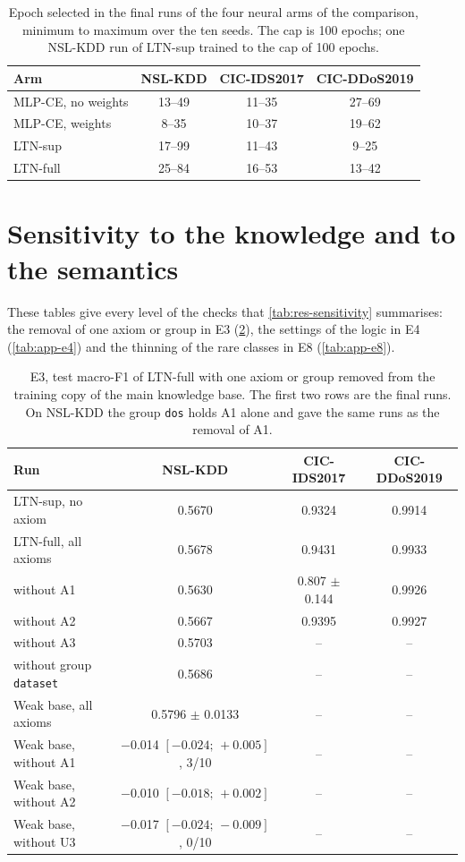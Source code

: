 \begin{table}[htbp]
\centering
\footnotesize
\caption{Epoch selected in the final runs of the four neural arms of the comparison, minimum to maximum over the ten
seeds. The cap is 100 epochs; one NSL-KDD run of LTN-sup trained to the cap of 100 epochs.}
\label{tab:app-epochs}
\setlength{\tabcolsep}{4pt}
\begin{tabular}{@{}lccc@{}}
\toprule
Arm & NSL-KDD & CIC-IDS2017 & CIC-DDoS2019 \\
\midrule
MLP-CE, no weights & 13--49 & 11--35 & 27--69 \\
MLP-CE, weights    & 8--35 & 10--37 & 19--62 \\
LTN-sup            & 17--99 & 11--43 & 9--25 \\
LTN-full           & 25--84 & 16--53 & 13--42 \\
\bottomrule
\end{tabular}
\end{table}

\FloatBarrier
\section{Sensitivity to the knowledge and to the semantics}

These tables give every level of the checks that \cref{tab:res-sensitivity} summarises: the removal of
one axiom or group in E3 (\cref{tab:app-e3}), the settings of the logic in E4 (\cref{tab:app-e4}) and the
thinning of the rare classes in E8 (\cref{tab:app-e8}).


\begin{table}[htbp]
\centering
\footnotesize
\caption{E3, test macro-F1 of LTN-full with one axiom or group removed from the training copy of the main knowledge
base. The first two rows are the final runs. On NSL-KDD the group \texttt{dos} holds A1 alone and gave the same
runs as the removal of A1.}
\label{tab:app-e3}
\setlength{\tabcolsep}{4pt}
\begin{tabular}{@{}lccc@{}}
\toprule
Run & NSL-KDD & CIC-IDS2017 & CIC-DDoS2019 \\
\midrule
LTN-sup, no axiom    & 0.5670 & 0.9324 & 0.9914 \\
LTN-full, all axioms & 0.5678 & 0.9431 & 0.9933 \\
\midrule
without A1           & 0.5630 & 0.807 $\pm$ 0.144 & 0.9926 \\
without A2           & 0.5667 & 0.9395 & 0.9927 \\
without A3           & 0.5703 & -- & -- \\
without group \texttt{dataset} & 0.5686 & -- & -- \\
\midrule
Weak base, all axioms & 0.5796 $\pm$ 0.0133 & -- & -- \\
Weak base, without A1 & $-$0.014 $[-0.024;\,+0.005]$, 3/10 & -- & -- \\
Weak base, without A2 & $-$0.010 $[-0.018;\,+0.002]$ & -- & -- \\
Weak base, without U3 & $-$0.017 $[-0.024;\,-0.009]$, 0/10 & -- & -- \\
\bottomrule
\end{tabular}
\end{table}

